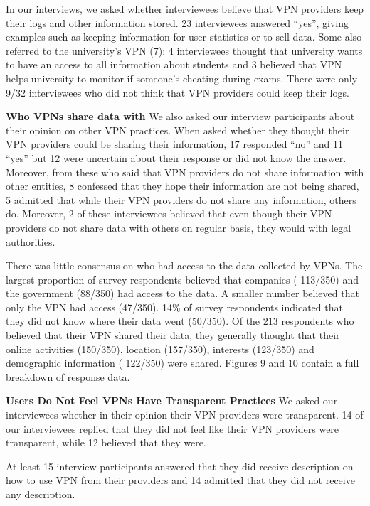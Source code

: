 In our interviews, we asked whether
interviewees believe that VPN providers keep their logs and other information stored.
23 interviewees answered “yes”, giving examples such as keeping information
for user statistics or to sell data. Some also referred to the
university’s VPN (7): 4 interviewees thought that university wants to have an
access to all information about students and 3 believed that VPN helps university to monitor
if someone’s cheating during exams. There were only 9/32 interviewees who did not
think that VPN providers could keep their logs.



\textbf{Who VPNs share data with} We also asked our interview participants
about their opinion on other VPN practices. When asked whether they thought
their VPN providers could be sharing their information, 17 responded “no” and
11 “yes” but 12 were uncertain about their response or did not know the
answer.  Moreover, from these who said that VPN providers do not share
information with other entities, 8 confessed that they hope their information
are not being shared, 5 admitted that while their VPN providers do not share
any information, others do. Moreover, 2 of these interviewees believed that
even though their VPN providers do not share data with others on regular
basis, they would with legal authorities. 

There was little consensus on who had access to the data collected by VPNs.
The largest proportion of survey respondents believed that companies (
113/350) and the government (88/350) had access to the data. A
smaller number believed that only the VPN had access (47/350). 14\% of survey respondents indicated that they did not know where
their data went (50/350). Of the 213 respondents who believed that their
VPN shared their data, they generally thought that their online activities
(150/350), location (157/350), interests (123/350) and
demographic information ( 122/350) were shared. Figures 9 and 10 contain
a full breakdown of response data.

\textbf{Users Do Not Feel VPNs Have Transparent Practices}
We asked our interviewees whether in
their opinion their VPN providers were transparent. 14 of our interviewees
replied that they did not feel like their VPN providers were transparent,
while 12 believed that they were. 

At least 15 interview participants answered that they did receive description
on how to use VPN from their providers and 14 admitted that they did not
receive any description.  

